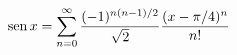 \item $\operatorname{sen} x = \displaystyle\sum_{n=0}^\infty \frac{(-1)^{n(n-1)/2}}{\sqrt{2}} \frac{(x - \pi/4)^n}{n!}$
